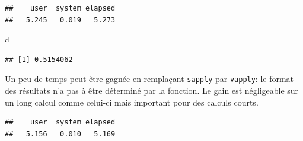 \documentclass[
  12pt,
  french,
  a4paper,
  extrafontsizes,onecolumn,openright
  ]{memoir}
\newenvironment{Shaded}{\begin{snugshade}}{\end{snugshade}}
\newcommand{\ControlFlowTok}[1]{\textcolor[rgb]{0.13,0.29,0.53}{\textbf{#1}}}
\newcommand{\DecValTok}[1]{\textcolor[rgb]{0.00,0.00,0.81}{#1}}
\newcommand{\KeywordTok}[1]{\textcolor[rgb]{0.13,0.29,0.53}{\textbf{#1}}}
\newcommand{\NormalTok}[1]{#1}
\newcommand{\OperatorTok}[1]{\textcolor[rgb]{0.81,0.36,0.00}{\textbf{#1}}}
\newcommand{\StringTok}[1]{\textcolor[rgb]{0.31,0.60,0.02}{#1}}
\begin{document}
\begin{verbatim}
##    user  system elapsed 
##   5.245   0.019   5.273
\end{verbatim}

\begin{Shaded}
\begin{Highlighting}[]
\NormalTok{d}
\end{Highlighting}
\end{Shaded}

\begin{verbatim}
## [1] 0.5154062
\end{verbatim}

\normalsize

Un peu de temps peut être gagnée en remplaçant \texttt{sapply} par \texttt{vapply}: le format des résultats n'a pas à être déterminé par la fonction.
Le gain est négligeable sur un long calcul comme celui-ci mais important pour des calculs courts.

\scriptsize

\begin{Shaded}
\end{Shaded}

\begin{verbatim}
##    user  system elapsed 
##   5.156   0.010   5.169
\end{verbatim}
\end{document}
